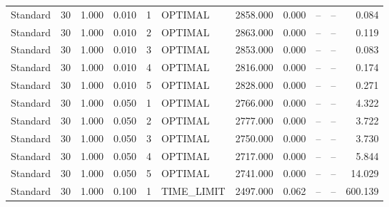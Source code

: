 \begin{table}
\begin{tabular}{lrrrrlrrrrr}
Standard & 30 & 1.000 & 0.010 & 1 & OPTIMAL & 2858.000 & 0.000 & -- & -- & 0.084 \\
Standard & 30 & 1.000 & 0.010 & 2 & OPTIMAL & 2863.000 & 0.000 & -- & -- & 0.119 \\
Standard & 30 & 1.000 & 0.010 & 3 & OPTIMAL & 2853.000 & 0.000 & -- & -- & 0.083 \\
Standard & 30 & 1.000 & 0.010 & 4 & OPTIMAL & 2816.000 & 0.000 & -- & -- & 0.174 \\
Standard & 30 & 1.000 & 0.010 & 5 & OPTIMAL & 2828.000 & 0.000 & -- & -- & 0.271 \\
Standard & 30 & 1.000 & 0.050 & 1 & OPTIMAL & 2766.000 & 0.000 & -- & -- & 4.322 \\
Standard & 30 & 1.000 & 0.050 & 2 & OPTIMAL & 2777.000 & 0.000 & -- & -- & 3.722 \\
Standard & 30 & 1.000 & 0.050 & 3 & OPTIMAL & 2750.000 & 0.000 & -- & -- & 3.730 \\
Standard & 30 & 1.000 & 0.050 & 4 & OPTIMAL & 2717.000 & 0.000 & -- & -- & 5.844 \\
Standard & 30 & 1.000 & 0.050 & 5 & OPTIMAL & 2741.000 & 0.000 & -- & -- & 14.029 \\
Standard & 30 & 1.000 & 0.100 & 1 & TIME\_LIMIT & 2497.000 & 0.062 & -- & -- & 600.139 \\
\bottomrule
\end{tabular}
\end{table}
